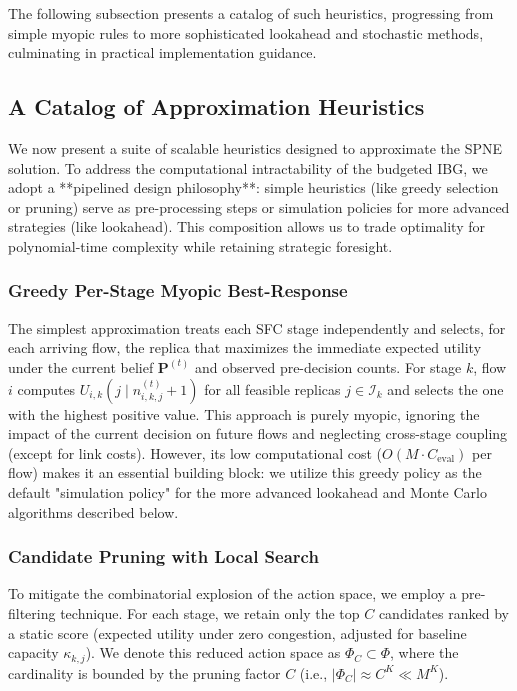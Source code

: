 \documentclass[journal]{IEEEtran}
\theoremstyle{plain}
\theoremstyle{definition}
\theoremstyle{remark}
\begin{document}
The following subsection presents a catalog of such heuristics, progressing from simple myopic rules to more sophisticated lookahead and stochastic methods, culminating in practical implementation guidance.


\subsection{A Catalog of Approximation Heuristics}
\label{sec:approx_catalog}

We now present a suite of scalable heuristics designed to approximate the SPNE solution. To address the computational intractability of the budgeted IBG, we adopt a **pipelined design philosophy**: simple heuristics (like greedy selection or pruning) serve as pre-processing steps or simulation policies for more advanced strategies (like lookahead). This composition allows us to trade optimality for polynomial-time complexity while retaining strategic foresight.

\subsubsection{Greedy Per-Stage Myopic Best-Response}
\label{sec:approx_greedy}

The simplest approximation treats each SFC stage independently and selects, for each arriving flow, the replica that maximizes the immediate expected utility under the current belief $\mathbf{P}^{(t)}$ and observed pre-decision counts. For stage $k$, flow $i$ computes $U_{i,k}(j \mid n_{i,k,j}^{(t)} + 1)$ for all feasible replicas $j \in \mathcal{I}_k$ and selects the one with the highest positive value. This approach is purely myopic, ignoring the impact of the current decision on future flows and neglecting cross-stage coupling (except for link costs). However, its low computational cost ($O(M \cdot C_{\text{eval}})$ per flow) makes it an essential building block: we utilize this greedy policy as the default "simulation policy" for the more advanced lookahead and Monte Carlo algorithms described below.

\subsubsection{Candidate Pruning with Local Search}
\label{sec:approx_pruning}

To mitigate the combinatorial explosion of the action space, we employ a pre-filtering technique. For each stage, we retain only the top $C$ candidates ranked by a static score (expected utility under zero congestion, adjusted for baseline capacity $\kappa_{k,j}$). We denote this reduced action space as $\Phi_C \subset \Phi$, where the cardinality is bounded by the pruning factor $C$ (i.e., $|\Phi_C| \approx C^K \ll M^K$). 
\end{document}
